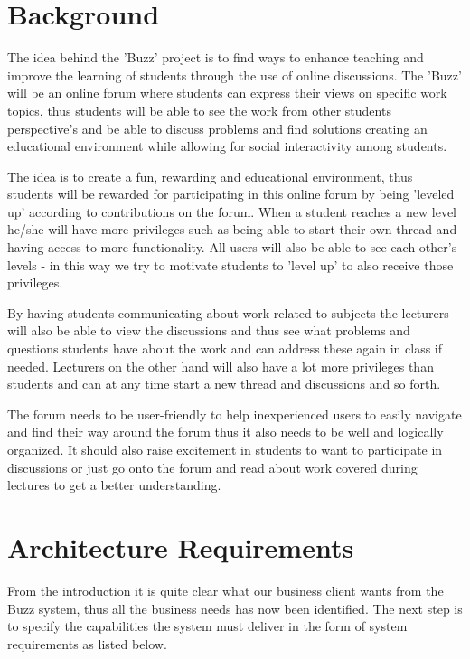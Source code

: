 \documentclass[a4paper]{article}
\begin{document}
\section{Background}
The idea behind the 'Buzz' project is to find ways to enhance teaching and improve the learning of students through the use of online discussions. The 'Buzz' will be an online forum where students can express their views on specific work topics, thus students will be able to see the work from other students perspective's and be able to discuss problems and find solutions creating an educational environment while allowing for social interactivity among students.

The idea is to create a fun, rewarding and educational environment, thus students will be rewarded for participating in this online forum by being 'leveled up' according to contributions on the forum. When a student reaches a new level he/she will have more privileges such as being able to start their own thread and having access to more functionality. All users will also be able to see each other's levels - in this way we try to motivate students to 'level up' to also receive those privileges. 

By having students communicating about work related to subjects the lecturers will also be able to view the discussions and thus see what problems and questions students have about the work and can address these again in class if needed. Lecturers on the other hand will also have a lot more privileges than students and can at any time start a new thread and discussions and so forth. 

The forum needs to be user-friendly to help inexperienced users to easily navigate and find their way around the forum thus it also needs to be well and logically organized. It should also raise excitement in students to want to participate in discussions or just go onto the forum and read about work covered during lectures to get a better understanding. 


\section{Architecture Requirements}

From the introduction it is quite clear what our business client wants from the Buzz system, thus all the business needs has now been identified. The next step is to specify the capabilities the system must deliver in the form of system requirements as listed  below. 
\end{document}
